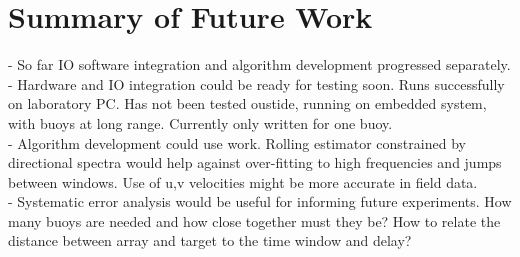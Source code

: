 \documentclass[11pt]{article}
\begin{document}
\section{Summary of Future Work}
- So far IO software integration and algorithm development progressed separately.  \\
- Hardware and IO integration could be ready for testing soon. Runs successfully on laboratory PC.  Has not been tested oustide, running on embedded system, with buoys at long range.  Currently only written for one buoy.  \\
- Algorithm development could use work.  Rolling estimator constrained by directional spectra would help against over-fitting to high frequencies and jumps between windows. Use of u,v velocities might be more accurate in field data. \\ 
- Systematic error analysis would be useful for informing future experiments.  How many buoys are needed and how close together must they be?   How to relate the distance between array and target to the time window and delay?



\end{document}
